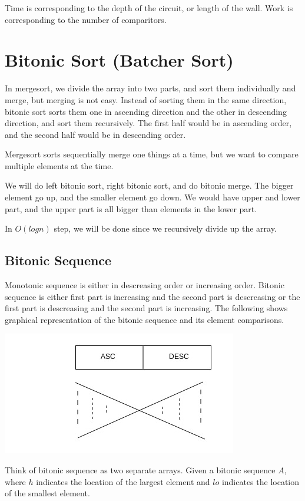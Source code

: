 \documentclass[twoside]{article}
\begin{document}
Time is corresponding to the depth of the circuit, or length of the wall.
Work is corresponding to the number of comparitors.

\section{Bitonic Sort (Batcher Sort)}
In mergesort, we divide the array into two parts, and sort them individually and merge, but merging is not easy. Instead of sorting them in the same direction, bitonic sort sorts them one in ascending direction and the other in descending direction, and sort them recursively. The first half would be in ascending order, and the second half would be in descending order.

Mergesort sorts sequentially merge one things at a time, but we want to compare multiple elements at the time.

We will do left bitonic sort, right bitonic sort, and do bitonic merge. The bigger element go up, and the smaller element go down. We would have upper and lower part, and the upper part is all bigger than elements in the lower part. 

In $O(logn)$ step, we will be done since we recursively divide up the array. 

\subsection{Bitonic Sequence}
Monotonic sequence is either in descreasing order or increasing order. Bitonic sequence is either first part is increasing and the second part is descreasing or the first part is descreasing and the second part is increasing. The following shows graphical representation of the bitonic sequence and its element comparisons. 

\includegraphics[scale=0.5]{g3}

Think of bitonic sequence as two separate arrays. Given a bitonic sequence $A$, where $h$ indicates the location of the largest element and $lo$ indicates the location of the smallest element. 
\end{document}
